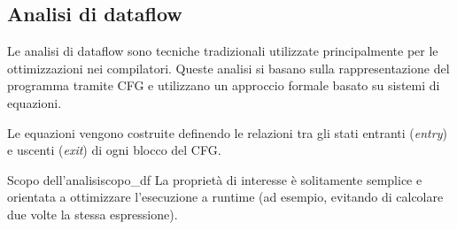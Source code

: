 \subsection{Analisi di dataflow}\label{subsec:dataflow_analysis}

Le analisi di dataflow sono tecniche tradizionali utilizzate principalmente
per le ottimizzazioni nei compilatori.
Queste analisi si basano sulla rappresentazione del programma tramite
CFG e utilizzano un approccio formale basato su sistemi di equazioni.

Le equazioni vengono costruite definendo le relazioni
tra gli stati entranti (\textit{entry}) e uscenti (\textit{exit}) di ogni
blocco del CFG.

\begin{nota}{Scopo dell'analisi}{scopo_df}
La proprietà di interesse è solitamente semplice e orientata a ottimizzare
l'esecuzione a runtime (ad esempio, evitando di calcolare due volte la stessa
espressione).
\end{nota}


